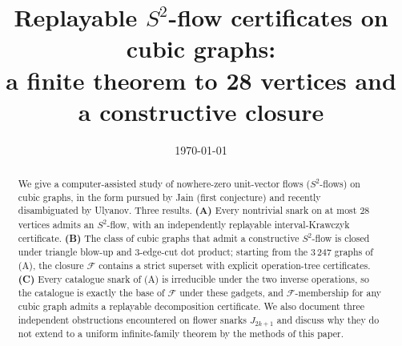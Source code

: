 \documentclass[11pt,a4paper]{article}
\title{Replayable \( S^{2} \)-flow certificates on cubic graphs:\\
       a finite theorem to 28 vertices and a constructive closure}
\author{
  \TODO{author}
}
\date{\today}
\theoremstyle{definition}
\theoremstyle{remark}
\newcommand{\Sphere}{S^{2}}
\newcommand{\closure}{\mathcal{F}}
\begin{document}
\maketitle

\begin{abstract}
We give a computer-assisted study of nowhere-zero unit-vector flows
($\Sphere$-flows) on cubic graphs, in the form pursued by Jain (first
conjecture) and recently disambiguated by Ulyanov. Three results.
\textbf{(A)} Every nontrivial snark on at most 28 vertices admits an
$\Sphere$-flow, with an independently replayable interval-Krawczyk
certificate. \textbf{(B)} The class of cubic graphs that admit a
constructive $\Sphere$-flow is closed under triangle blow-up and
$3$-edge-cut dot product; starting from the 3\,247 graphs of (A),
the closure $\closure$ contains a strict superset with explicit
operation-tree certificates. \textbf{(C)} Every catalogue snark of
(A) is irreducible under the two inverse operations, so the
catalogue is exactly the base of $\closure$ under these gadgets, and
$\closure$-membership for any cubic graph admits a replayable
decomposition certificate. We also document three independent
obstructions encountered on flower snarks $J_{2k+1}$ and discuss why
they do not extend to a uniform infinite-family theorem by the
methods of this paper.
\end{abstract}

\tableofcontents













\end{document}
